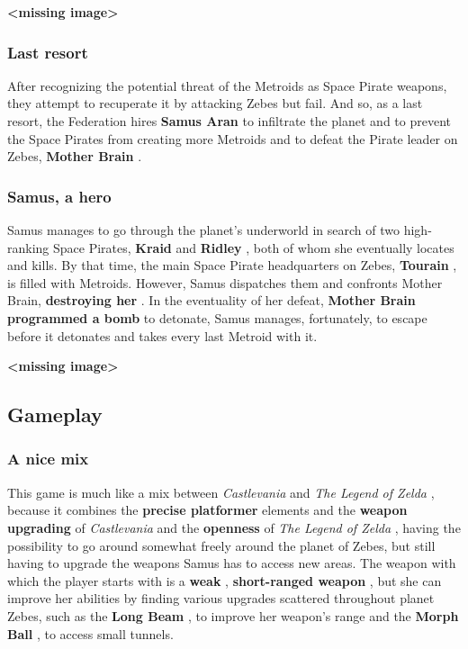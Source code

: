 \documentclass[a4paper,10pt]{book}
\begin{document}
 
 \textbf{<missing image>}
 
 \subsubsection{Last resort }
 After
          recognizing the potential threat of the Metroids as Space Pirate
          weapons, they attempt to recuperate it by attacking Zebes but fail.
          And so, as a last resort, the Federation hires  \textbf{Samus Aran }  to
          infiltrate the planet and to prevent the Space Pirates from creating
          more Metroids and to defeat the Pirate leader on Zebes,  \textbf{Mother
          Brain } . 
 \subsubsection{Samus, a hero }
 Samus
          manages to go through the planet's underworld in search of two
          high-ranking Space Pirates,  \textbf{Kraid }  and  \textbf{Ridley } , both of whom she
          eventually locates and kills. By that time, the main Space Pirate
          headquarters on Zebes,  \textbf{Tourain } , is filled with Metroids. However,
          Samus dispatches them and confronts Mother Brain,  \textbf{destroying her } . In
          the eventuality of her defeat,  \textbf{Mother Brain programmed a bomb }  to
          detonate, Samus manages, fortunately, to escape before it detonates
          and takes every last Metroid with it. 
 
 \textbf{<missing image>}
 
 \subsection{Gameplay }
 \subsubsection{A nice mix }
 This game is
          much like a mix between  \textit{Castlevania } and  \textit{The Legend of
          Zelda }, because it combines the  \textbf{precise platformer }  elements and the
           \textbf{weapon upgrading }  of  \textit{Castlevania } and the  \textbf{openness }  of  \textit{The Legend
          of Zelda }, having the possibility to go around somewhat freely
          around the planet of Zebes, but still having to upgrade the weapons Samus
          has to access new areas. The weapon with which the player starts with is a
           \textbf{weak } ,  \textbf{short-ranged weapon } , but she can improve her abilities by finding
          various upgrades scattered throughout planet Zebes, such as the  \textbf{Long Beam } ,
          to improve her weapon's range and the  \textbf{Morph Ball } , to access small tunnels.
           
\end{document}
